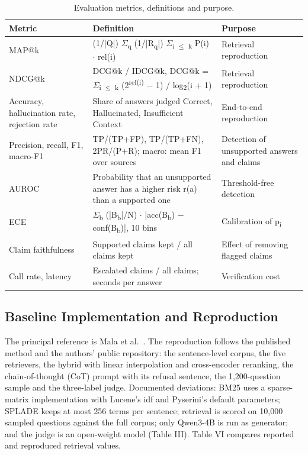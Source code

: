 \documentclass[conference]{IEEEtran}
\begin{document}
\begin{table}[t]
\centering
\caption{Evaluation metrics, definitions and purpose.}
\label{tab:t5}
\footnotesize
\setlength{\tabcolsep}{3pt}
\renewcommand{\arraystretch}{1.12}
\begin{tabularx}{\textwidth}{>{\raggedright\arraybackslash\hsize=0.712\hsize}X>{\raggedright\arraybackslash\hsize=1.537\hsize}X>{\raggedright\arraybackslash\hsize=0.750\hsize}X}
\toprule
\textbf{Metric} & \textbf{Definition} & \textbf{Purpose} \\
\midrule
MAP@k & (1/|Q|) $\Sigma$\textsubscript{q} (1/|R\textsubscript{q}|) $\Sigma$\textsubscript{i $\le$ k} P(i) $\cdot$ rel(i) & Retrieval reproduction \\
NDCG@k & DCG@k / IDCG@k, DCG@k = $\Sigma$\textsubscript{i $\le$ k} (2\textsuperscript{rel(i)} $-$ 1) / log\textsubscript{2}(i + 1) & Retrieval reproduction \\
Accuracy, hallucination rate, rejection rate & Share of answers judged Correct, Hallucinated, Insufficient Context & End-to-end reproduction \\
Precision, recall, F1, macro-F1 & TP/(TP+FP), TP/(TP+FN), 2PR/(P+R); macro: mean F1 over sources & Detection of unsupported answers and claims \\
AUROC & Probability that an unsupported answer has a higher risk r(a) than a supported one & Threshold-free detection \\
ECE & $\Sigma$\textsubscript{b} (|B\textsubscript{b}|/N) $\cdot$ |acc(B\textsubscript{b}) $-$ conf(B\textsubscript{b})|, 10 bins & Calibration of p\textsubscript{i} \\
Claim faithfulness & Supported claims kept / all claims kept & Effect of removing flagged claims \\
Call rate, latency & Escalated claims / all claims; seconds per answer & Verification cost \\
\bottomrule
\end{tabularx}
\end{table}

\subsection{Baseline Implementation and Reproduction}

The principal reference is Mala et al.~\cite{mala_ml}. The reproduction follows the published method and the authors' public repository: the sentence-level corpus, the five retrievers, the hybrid with linear interpolation and cross-encoder reranking, the chain-of-thought (CoT) prompt with its refusal sentence, the 1,200-question sample and the three-label judge. Documented deviations: BM25 uses a sparse-matrix implementation with Lucene's idf and Pyserini's default parameters; SPLADE keeps at most 256 terms per sentence; retrieval is scored on 10,000 sampled questions against the full corpus; only Qwen3-4B is run as generator; and the judge is an open-weight model (Table III). Table VI compares reported and reproduced retrieval values.
\end{document}
